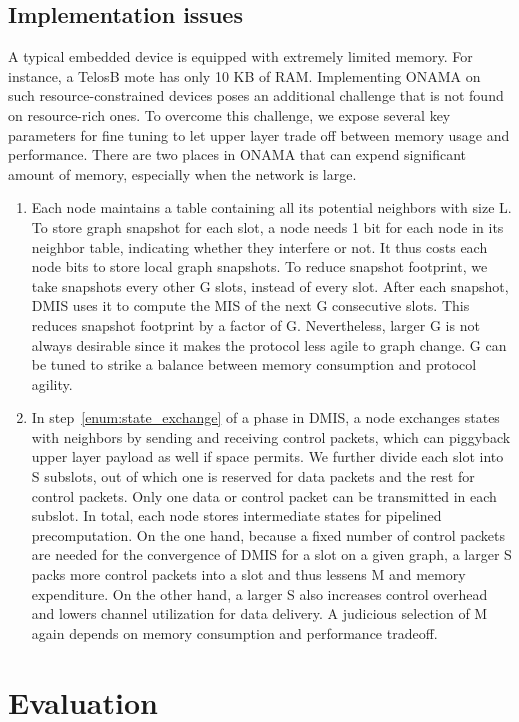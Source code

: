 \documentclass[conference]{IEEEtran}
\begin{document}
\subsection{Implementation issues}	\label{subsection:impl}
A typical embedded device is equipped with extremely limited memory. For instance, a TelosB \cite{telosb} mote has only 10 KB of RAM. Implementing ONAMA on such resource-constrained devices poses an additional challenge that is not found on resource-rich ones. To overcome this challenge, we expose several key parameters for fine tuning to let upper layer trade off between memory usage and performance. There are two places in ONAMA that can expend significant amount of memory, especially when the network is large.
\begin{enumerate}
\item
Each node maintains a table containing all its potential neighbors with size L. To store graph snapshot for each slot, a node needs 1 bit for each node in its neighbor table, indicating whether they interfere or not. It thus costs each node  bits to store local graph snapshots. To reduce snapshot footprint, we take snapshots every other G slots, instead of every slot. After each snapshot, DMIS uses it to compute the MIS of the next G consecutive slots. This reduces snapshot footprint by a factor of G. Nevertheless, larger G is not always desirable since it  makes the protocol less agile to graph change. G can be tuned to strike a balance between memory consumption and protocol agility.

\item
In step~\ref{enum:state_exchange} of a phase in DMIS, a node exchanges states with neighbors by sending and receiving control packets, which can piggyback upper layer payload as well if space permits. We further divide each slot into S subslots, out of which one is reserved for data packets and the rest for control packets. Only one data or control packet can be transmitted in each subslot. In total, each node stores  intermediate states for pipelined precomputation. On the one hand, because a fixed number of control packets are needed for the convergence of DMIS for a slot on a given graph,  a larger S packs more control packets into a slot and thus lessens M and memory expenditure. On the other hand, a larger S also increases control overhead and lowers channel utilization for data delivery. A judicious selection of M again depends on memory consumption and performance tradeoff.
\end{enumerate}
 \section{Evaluation} \label{section:evaluation}
\end{document}
